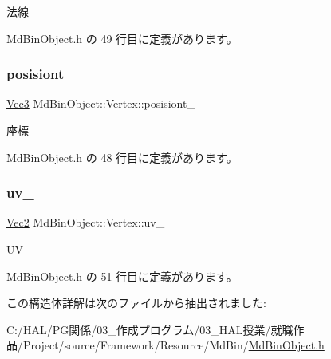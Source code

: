 法線 



 Md\+Bin\+Object.\+h の 49 行目に定義があります。

\mbox{\label{struct_md_bin_object_1_1_vertex_a72d99e25154ce98623654e54dbff6ec1}} 
\subsubsection{\texorpdfstring{posisiont\+\_\+}{posisiont\_}}
{\footnotesize\ttfamily \mbox{\hyperlink{_vector3_d_8h_ab16f59e4393f29a01ec8b9bbbabbe65d}{Vec3}} Md\+Bin\+Object\+::\+Vertex\+::posisiont\+\_\+}



座標 



 Md\+Bin\+Object.\+h の 48 行目に定義があります。

\mbox{\label{struct_md_bin_object_1_1_vertex_a965874f66728b2e4f29573716ed617d5}} 
\subsubsection{\texorpdfstring{uv\+\_\+}{uv\_}}
{\footnotesize\ttfamily \mbox{\hyperlink{_vector3_d_8h_a5ef6e95dfc5f9d3820b71772d99bbc25}{Vec2}} Md\+Bin\+Object\+::\+Vertex\+::uv\+\_\+}



UV 



 Md\+Bin\+Object.\+h の 51 行目に定義があります。



この構造体詳解は次のファイルから抽出されました\+:\begin{DoxyCompactItemize}
\item 
C\+:/\+H\+A\+L/\+P\+G関係/03\+\_\+作成プログラム/03\+\_\+\+H\+A\+L授業/就職作品/\+Project/source/\+Framework/\+Resource/\+Md\+Bin/\mbox{\hyperlink{_md_bin_object_8h}{Md\+Bin\+Object.\+h}}\end{DoxyCompactItemize}
